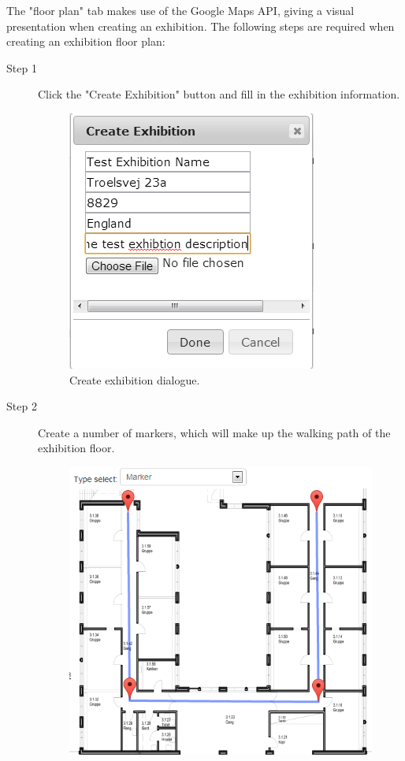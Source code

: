 The "floor plan" tab makes use of the Google Maps API, giving a visual presentation when creating an exhibition.
The following steps are required when creating an exhibition floor plan:
\begin{description}
	\item[Step 1] Click the "Create Exhibition" button and fill in the exhibition information.
	\begin{figure}[H]
		\centering
		\includegraphics[scale=0.5]{img/website/step2.png}
		\caption{Create exhibition dialogue.\label{fig:websitestep1}}
	\end{figure}
	\item[Step 2] Create a number of markers, which will make up the walking path of the exhibition floor.
	\begin{figure}[H]
		\centering
		\includegraphics[scale=0.5]{img/website/step3.png}

\end{figure}
\end{description}
